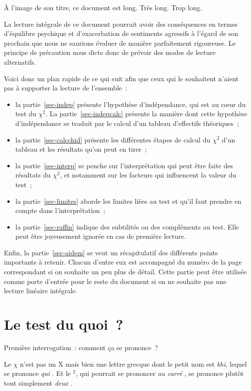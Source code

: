 \documentclass[a4paper,10pt,twoside,francais]{report}
\newcommand{\chid}{$\chi^2$\xspace}
\begin{document}
À l'image de son titre, ce document est long. Très long. Trop long.

La lecture intégrale de ce document pourrait avoir des conséquences en
termes d'équilibre psychique et d'exacerbation de sentiments
agressifs à l'égard de son prochain que nous ne saurions évaluer de
manière parfaitement rigoureuse. Le principe de précaution nous dicte
donc de prévoir des modes de lecture alternatifs.

Voici donc un plan rapide de ce qui suit afin que ceux qui le
souhaitent n'aient pas à supporter la lecture de l'ensemble~:

\begin{itemize}
\item la partie~\ref{sec-indep} présente l'hypothèse d'indépendance,
  qui est au c\oe{}ur du test du \chid. La partie~\ref{sec-indepcalc}
  présente la manière dont cette hypothèse d'indépendance se traduit
  par le calcul d'un tableau d'effectifs théoriques~;
\item la partie~\ref{sec-calcchid} présente les différentes étapes de
  calcul du \chid d'un tableau et les résultats qu'on peut en tirer~;
\item la partie~\ref{sec-interp} se penche sur l'interprétation qui
  peut être faite des résultats du \chid, et notamment sur les facteurs
  qui influencent la valeur du test~;
\item la partie~\ref{sec-limites} aborde les limites liées au test et
  qu'il faut prendre en compte dans l'interprétation~;
\item la partie~\ref{sec-raffin} indique des subtilités ou des
  compléments au test. Elle peut être joyeusement ignorée en cas de
  première lecture.
\end{itemize}

Enfin, la partie~\ref{sec-aidem} se veut un récapitulatif des
différents points importants à retenir. Chacun d'entre eux est
accompagné du numéro de la page correspondant si on souhaite un peu
plus de détail. Cette partie peut être utilisée comme \og porte
d'entrée \fg{} pour le reste du document si on ne souhaite pas une
lecture linéaire intégrale.


\section{Le test du quoi~?}

Première interrogation~: comment ça se prononce~?

Le $\chi$ n'est pas un X mais bien une lettre grecque dont le petit
nom est \textit{khi}, lequel se prononce \textit{\og qui \fg{}}. Et le
$^2$, qui pourrait se prononcer \textit{\og au carré \fg{}}, se prononce
plutôt tout simplement \textit{\og deux \fg{}}.
\end{document}
